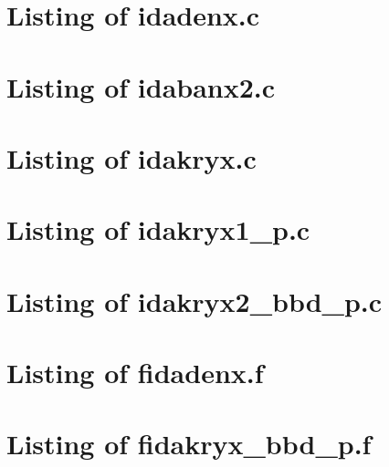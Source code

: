 
\lstset{language=C}

\newpage
\section{Listing of idadenx.c}\label{s:idadenx_c}

\newpage
\section{Listing of idabanx2.c}\label{s:idabanx2_c}

\newpage
\section{Listing of idakryx.c}\label{s:idakryx_c}


\newpage
\section{Listing of idakryx1\_p.c}\label{s:idakryx1_p_c}

\newpage
\section{Listing of idakryx2\_bbd\_p.c}\label{s:idakryx2_bbd_p_c}


\lstset{language=[77]Fortran}

\newpage
\section{Listing of fidadenx.f}\label{s:fidadenx_f}

\newpage
\section{Listing of fidakryx\_bbd\_p.f}\label{s:fidakryx_bbd_p}
